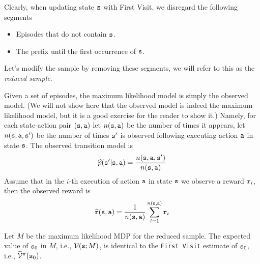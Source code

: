 Clearly, when updating state ${\tt s}$ with First Visit, 
we disregard the following segments
\begin{itemize}
    \item Episodes that do not contain ${\tt s}$.
    \item The prefix until the first occurrence of ${\tt s}$.
\end{itemize}
Let's modify the sample by removing these segments,
we will refer to this as the {\em reduced sample}.

Given a set of episodes, the maximum likelihood model is simply the
observed model. (We will not show here that the observed model is 
indeed the maximum likelihood model, but it is a good exercise for the reader to show it.) 
Namely, for each state-action
pair $({\tt s},{\tt a})$ let $n({\tt s},{\tt a})$ be the number of
times it appears, let $n({\tt s},{\tt a},{\tt s}')$ be the number of
times ${\tt s}'$ is observed following executing action ${\tt a}$ in
state ${\tt s}$. The observed transition model is
\[\widehat{p}({\tt s}'|{\tt s},{\tt a})=\frac{n({\tt s},{\tt a},{\tt s}')}{n({\tt s},{\tt a})}\]
Assume that in the $i$-th execution of action ${\tt a}$ in state
${\tt s}$ we observe a reward ${\tt r}_i$, then the observed reward is
\[\widehat{{\tt r}}({\tt s},{\tt a})=\frac{1}{n({\tt s},{\tt a})}\sum_{i=1}^{n({\tt s},{\tt a})}
{\tt r}_i\]

\begin{theorem}
\label{thm:MC-ML}
%
Let $M$ be the maximum likelihood MDP for the reduced sample. The
expected value of ${\tt s}_0$ in $M$, i.e., $\mathcal{V}({\tt s};M)$, is
identical to the {\tt First Visit} estimate of ${\tt s}_0$, i.e.,
$\widehat{\mathcal{V}}^\pi({\tt s}_0)$.
\end{theorem}


